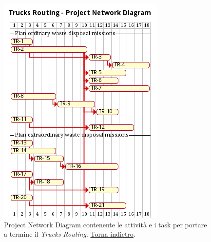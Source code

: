 \begin{figure}[H]
    \centering
    \includegraphics[width=\textwidth]{../img/gantt-trucks-routing.pm}
    \caption{Project Network Diagram contenente le attività e i task per portare a termine il \textit{Trucks Routing}. \hyperlink{back:gantt-trucks-routing}{Torna indietro}.}
    \label{fig:gantt-trucks-routing}
\end{figure}

